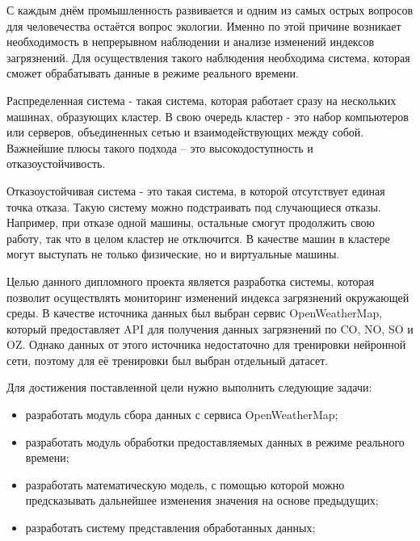 \label{sec:intro}

С каждым днём промышленность развивается и одним из самых острых вопросов для человечества остаётся вопрос экологии.
Именно по этой причине возникает необходимость в непрерывном наблюдении и анализе изменений индексов загрязнений.
Для осуществления такого наблюдения необходима система, которая сможет обрабатывать данные в режиме реального времени.

Распределенная система - такая система, которая работает сразу на нескольких машинах, образующих кластер.
В свою очередь кластер - это набор компьютеров или серверов, объединенных сетью и взаимодействующих между собой.
Важнейшие плюсы такого подхода – это высокодоступность и отказоустойчивость.

Отказоустойчивая система - это такая система, в которой отсутствует единая точка отказа.
Такую систему можно подстраивать под случающиеся отказы.
Например, при отказе одной машины, остальные смогут продолжить свою работу, так что в целом кластер не отключится.
В качестве машин в кластере могут выступать не только физические, но и виртуальные машины.

Целью данного дипломного проекта является разработка системы, которая позволит осуществлять мониторинг изменений индекса загрязнений окружающей среды.
В качестве источника данных был выбран сервис OpenWeatherMap, который предоставляет API для получения данных загрязнений по CO, NO, SO и OZ.
Однако данных от этого источника недостаточно для тренировки нейронной сети, поэтому для её тренировки был выбран отдельный датасет.


Для достижения поставленной цели нужно выполнить следующие задачи:
\begin{itemize}
    \item разработать модуль сбора данных с сервиса OpenWeatherMap;
    \item разработать модуль обработки предоставляемых данных в режиме реального времени;
    \item разработать математическую модель, с помощью которой можно предсказывать дальнейшее изменения значения на основе предыдущих;
    \item разработать систему представления обработанных данных;
\end{itemize}

